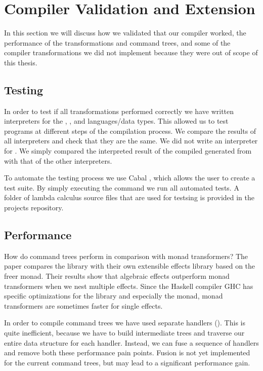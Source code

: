 \chapter{Compiler Validation and Extension}
In this section we will discuss how we validated that our compiler worked, the performance of the transformations and command trees, and some of the compiler transformations we did not implement because they were out of scope of this thesis.

\section{Testing}
In order to test if all transformations performed correctly we have written interpreters for the , , and  languages/data types. This allowed us to test programs at different steps of the compilation process. We compare the results of all interpreters and check that they are the same. We did not write an interpreter for . We simply compared the interpreted result of the compiled  generated from  with that of the other interpreters.

To automate the testing process we use Cabal \autocite{haskellcabal}, which allows the user to create a test suite. By simply executing the  command we run all automated tests. A folder of lambda calculus source files that are used for testsing is provided in the projects repository.

\section{Performance}
How do command trees perform in comparison with monad transformers? The paper  \autocite{DBLP:conf/haskell/KiselyovI15} compares the  library with their own extensible effects library based on the freer monad. Their results show that algebraic effects outperform monad transformers when we nest multiple effects. Since the Haskell compiler GHC has specific optimizations for the  library and especially the  monad, monad transformers are sometimes faster for single effects.

In order to compile command trees we have used separate handlers (). This is quite inefficient, because we have to build intermediate trees and traverse our entire data structure for each handler. Instead, we can fuse \autocite{DBLP:conf/mpc/WuS15} a sequence of handlers and remove both these performance pain points. Fusion is not yet implemented for the current command trees, but may lead to a significant performance gain.

